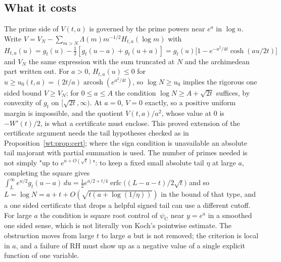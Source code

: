 \subsection{What it costs}

The prime side of $V(t,a)$ is governed by the prime powers near $e^a$ in $\log n$. Write $V=V_N-\sum_{m>N}\Lambda(m)m^{-1/2}H_{t,a}(\log m)$ with $H_{t,a}(u)=g_t(u)-\frac12[g_t(u-a)+g_t(u+a)]=g_t(u)\big[1-e^{-a^2/4t}\cosh(au/2t)\big]$ and $V_N$ the same expression with the sum truncated at $N$ and the archimedean part written out. For $a>0$, $H_{t,a}(u)\le0$ for $u\ge u_0(t,a)=(2t/a)\operatorname{arcosh}(e^{a^2/4t})$, so $\log N\ge u_0$ implies the rigorous one sided bound $V\ge V_N$; for $0\le a\le A$ the condition $\log N\ge A+\sqrt{2t}$ suffices, by convexity of $g_t$ on $[\sqrt{2t},\infty)$. At $a=0$, $V=0$ exactly, so a positive uniform margin is impossible, and the quotient $V(t,a)/a^2$, whose value at $0$ is $-W'(t)/2$, is what a certificate must enclose. This proved extension of the certificate argument needs the tail hypotheses checked as in Proposition~\ref{wt:prop:cert}; where the sign condition is unavailable an absolute tail majorant with partial summation is used. The number of primes needed is not simply "up to $e^{a+O(\sqrt t)}$": to keep a fixed small absolute tail $\eta$ at large $a$, completing the square gives $\int_L^\infty e^{u/2}g_t(u-a)\,du=\frac12e^{a/2+t/4}\operatorname{erfc}\big((L-a-t)/2\sqrt t\big)$ and so $L=\log N=a+t+O(\sqrt{t(a+\log(1/\eta))})$ in the bound of that type, and a one sided certificate that drops a helpful signed tail can use a different cutoff. For large $a$ the condition is square root control of $\psi_{\mathrm C}$ near $y=e^a$ in a smoothed one sided sense, which is not literally von Koch's pointwise estimate. The obstruction moves from large $t$ to large $a$ but is not removed; the criterion is local in $a$, and a failure of RH must show up as a negative value of a single explicit function of one variable.
